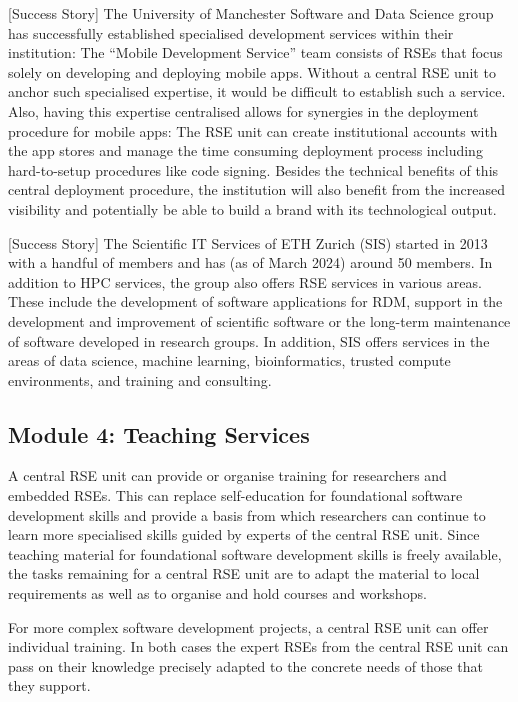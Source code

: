 \documentclass[a4paper]{article}
\begin{document}
[Success Story]
The University of Manchester Software and Data Science group has successfully established specialised development services within their institution:
The “Mobile Development Service” \autocite{manchester_mobile} team consists of RSEs that focus solely on developing and deploying mobile apps.
Without a central RSE unit to anchor such specialised expertise, it would be difficult to establish such a service.
Also, having this expertise centralised allows for synergies in the deployment procedure for mobile apps:
The RSE unit can create institutional accounts with the app stores and manage the time consuming deployment process including hard-to-setup procedures like code signing.
Besides the technical benefits of this central deployment procedure, the institution will also benefit from the increased visibility and potentially be able to build a brand with its technological output.

[Success Story]
The Scientific IT Services of ETH Zurich (SIS) started in 2013 with a handful of members and has (as of March 2024) around 50 members.
In addition to HPC services, the group also offers RSE services in various areas.
These include the development of software applications for RDM, support in the development and improvement of scientific software or the long-term maintenance of software developed in research groups.
In addition, SIS offers services in the areas of data science, machine learning, bioinformatics, trusted compute environments, and training and consulting.

\subsection{Module 4: Teaching Services}%
\label{sec:teaching}

A central RSE unit can provide or organise training for researchers and embedded RSEs.
This can replace self-education for foundational software development skills and provide a basis from which researchers can continue to learn more specialised skills guided by experts of the central RSE unit.
Since teaching material for foundational software development skills is freely available,
the tasks remaining for a central RSE unit are to adapt the material to local requirements as well as to organise and hold courses and workshops.

For more complex software development projects, a central RSE unit can offer individual training.
In both cases the expert RSEs from the central RSE unit can pass on their knowledge precisely adapted to the concrete needs of those that they support.
\end{document}
